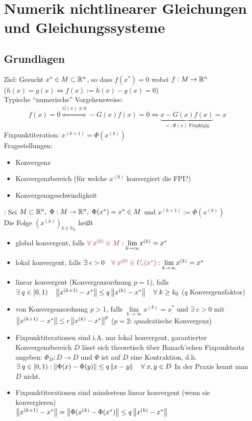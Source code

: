 \section{Numerik nichtlinearer Gleichungen und Gleichungssysteme}
\subsection{Grundlagen}
Ziel: Gesucht $x^* \in M \subset \mathbb{R}^{n}$, so dass $f(x^*) = 0$ wobei $f: M \rightarrow \mathbb{R}^{n}$\\
($ h(x) = g(x) \Leftrightarrow f(x) := h(x) - g(x) = 0$)\\
Typische ``numerische'' Vorgehensweise:
\begin{align*}
  f(x) = 0 \overset{G(x) \neq 0}{\Leftrightarrow} -G(x)f(x) = 0 \Leftrightarrow \underbrace{x - G(x)f(x)}_{=: \Phi(x) \text{ Fixpktglg}} = x
\end{align*}
Fixpunktiteration: $x^{(k+1)} = \Phi(x^{(k)})$\\
Fragestellungen:
\begin{itemize}
  \item Konvergenz
  \item Konvergenzbereich (für welche $x^{(0)}$ konvergiert die FPI?)
  \item Konvergenzgeschwindigkeit
\end{itemize}
: Sei $M \subset \mathbb{R}^{n},\;\Phi: M \rightarrow \mathbb{R}^{n},\;\Phi(x^*) = x^* \in M$ und $x^{(k+1)} := \Phi(x^{(k)})$\\
Die Folge $(x^{(k)})_{k \in \mathbb{N}_0}$ heißt
\begin{itemize}
  \item global konvergent, falls $\mathbin{\textcolor{rot}{\forall\;x^{(0)} \in M}}: \underset{k \rightarrow \infty}{\lim} x^{(k)} = x^*$
  \item lokal konvergent, falls $\exists\;\epsilon > 0 \quad \mathbin{\textcolor{rot}{\forall\;x^{(0)} \in U_\epsilon(x^*)}}: \underset{k \rightarrow \infty}{\mathrm{lim}} x^{(k)} = x^*$
  \item linear konvergent (Konvergenzordnung $p=1$), falls $\exists\; q \in [0,1)\quad \left\lVert x^{(k+1)} - x^* \right\rVert \leq q \left\lVert x^{(k)} - x^* \right\rVert \quad \forall\; k \geq k_0$
      ($q$ Konvergenzfaktor)
  \item von Konvergenzordnung $p > 1$, falls $\underset{k \rightarrow \infty}{\lim} x^{(k)} = x^*$ und $\exists\;c > 0$ mit
    $\left\lVert x^{(k+1)} - x^* \right\rVert \leq c \left\lVert x^{(k)} - x^* \right\rVert^p$ ($p=2$: quadratische Konvergenz)
  \item Fixpunktiterationen sind i.A. nur lokal konvergent, garantierter Konvergenzbereich $D$ lässt
    sich theoretisch über Banach'schen Fixpunktsatz angeben: $\Phi_D: D \rightarrow D$ und $\Phi$ ist auf $D$ eine Kontraktion,
    d.h. $\exists\; q \in [0,1): \left\lVert \Phi(x) - \Phi(y) \right\rVert \leq q\left\lVert x - y \right\rVert \quad \forall\;x,y \in D$
    In der Praxis kennt man $D$ nicht.
  \item Fixpunktiterationen sind mindestens linear konvergent (wenn sie konvergieren)\\
    $\left\lVert x^{(k+1)} - x^* \right\rVert = \left\lVert \Phi(x^{(k)} - \Phi(x^*) \right\rVert \leq q \left\lVert x^{(k)} - x^* \right\rVert$
\end{itemize}
